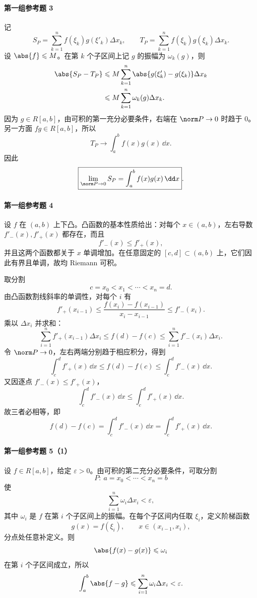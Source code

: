 \paragraph{第一组参考题 3}
\begin{xsolution}
记
\[
  S_P=\sum_{k=1}^n f(\xi_k)g(\xi'_k)\Delta x_k,
  \qquad
  T_P=\sum_{k=1}^n f(\xi_k)g(\xi_k)\Delta x_k.
\]
设 $\abs{f}\leqslant M$。在第 $k$ 个子区间上记 $g$ 的振幅为 $\omega_k(g)$，则
\begin{align*}
  \abs{S_P-T_P}
  &\leqslant M\sum_{k=1}^n
  \abs{g(\xi'_k)-g(\xi_k)}\Delta x_k\\
  &\leqslant M\sum_{k=1}^n\omega_k(g)\Delta x_k.
\end{align*}
因为 $g\in R[a,b]$，由可积的第一充分必要条件，右端在 $\norm P\to0$ 时趋于 $0$。另一方面 $fg\in R[a,b]$，所以
\[
  T_P\to\int_a^b f(x)g(x)\,\dd x.
\]
因此
\[
  \boxed{\lim_{\norm P\to0}S_P=
  \int_a^b f(x)g(x)\,\dd x}.
\]
\end{xsolution}

\paragraph{第一组参考题 4}
\begin{xsolution}
设 $f$ 在 $(a,b)$ 上下凸。凸函数的基本性质给出：对每个 $x\in(a,b)$，左右导数 $f'_-(x),f'_+(x)$ 都存在，而且
\[
  f'_-(x)\leqslant f'_+(x),
\]
并且这两个函数都关于 $x$ 单调增加。在任意固定的 $[c,d]\subset(a,b)$ 上，它们因此有界且单调，故均 Riemann 可积。

取分割
\[
  c=x_0<x_1<\cdots<x_n=d.
\]
由凸函数割线斜率的单调性，对每个 $i$ 有
\[
  f'_+(x_{i-1})
  \leqslant
  \frac{f(x_i)-f(x_{i-1})}{x_i-x_{i-1}}
  \leqslant f'_-(x_i).
\]
乘以 $\Delta x_i$ 并求和：
\[
  \sum_{i=1}^n f'_+(x_{i-1})\Delta x_i
  \leqslant f(d)-f(c)
  \leqslant
  \sum_{i=1}^n f'_-(x_i)\Delta x_i.
\]
令 $\norm P\to0$，左右两端分别趋于相应积分，得到
\[
  \int_c^d f'_+(x)\,\dd x
  \leqslant f(d)-f(c)
  \leqslant
  \int_c^d f'_-(x)\,\dd x.
\]
又因逐点 $f'_-(x)\leqslant f'_+(x)$，
\[
  \int_c^d f'_-(x)\,\dd x
  \leqslant\int_c^d f'_+(x)\,\dd x.
\]
故三者必相等，即
\[
  \boxed{f(d)-f(c)=\int_c^d f'_-(x)\,\dd x
  =\int_c^d f'_+(x)\,\dd x}.
\]
\end{xsolution}

\paragraph{第一组参考题 5（1）}
\begin{xsolution}
设 $f\in R[a,b]$，给定 $\varepsilon>0$。由可积的第二充分必要条件，可取分割
\[
  P:\ a=x_0<\cdots<x_n=b
\]
使
\[
  \sum_{i=1}^n\omega_i\Delta x_i<\varepsilon,
\]
其中 $\omega_i$ 是 $f$ 在第 $i$ 个子区间上的振幅。在每个子区间内任取 $\xi_i$，定义阶梯函数
\[
  g(x)=f(\xi_i),\qquad x\in(x_{i-1},x_i),
\]
分点处任意补定义。则
\[
  \abs{f(x)-g(x)}\leqslant\omega_i
\]
在第 $i$ 个子区间成立，所以
\[
  \int_a^b\abs{f-g}\leqslant
  \sum_{i=1}^n\omega_i\Delta x_i<\varepsilon.
\]
\end{xsolution}

